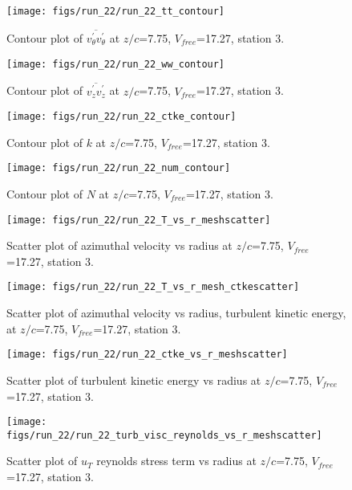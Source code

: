\begin{figure}[H]
\centering
\texttt{[image: figs/run\_22/run\_22\_tt\_contour]}
\caption{Contour plot of $\overline{v_{\theta}^{\prime} v_{\theta}^{\prime}}$ at $z/c$=7.75, $V_{free}$=17.27, station 3.}
\end{figure}


\begin{figure}[H]
\centering
\texttt{[image: figs/run\_22/run\_22\_ww\_contour]}
\caption{Contour plot of $\overline{v_{z}^{\prime} v_{z}^{\prime}}$ at $z/c$=7.75, $V_{free}$=17.27, station 3.}
\end{figure}


\begin{figure}[H]
\centering
\texttt{[image: figs/run\_22/run\_22\_ctke\_contour]}
\caption{Contour plot of $k$ at $z/c$=7.75, $V_{free}$=17.27, station 3.}
\end{figure}


\begin{figure}[H]
\centering
\texttt{[image: figs/run\_22/run\_22\_num\_contour]}
\caption{Contour plot of $N$ at $z/c$=7.75, $V_{free}$=17.27, station 3.}
\end{figure}


\begin{figure}[H]
\centering
\texttt{[image: figs/run\_22/run\_22\_T\_vs\_r\_meshscatter]}
\caption{Scatter plot of azimuthal velocity vs radius at $z/c$=7.75, $V_{free}$=17.27, station 3.}
\end{figure}


\begin{figure}[H]
\centering
\texttt{[image: figs/run\_22/run\_22\_T\_vs\_r\_mesh\_ctkescatter]}
\caption{Scatter plot of azimuthal velocity vs radius, turbulent kinetic energy, at $z/c$=7.75, $V_{free}$=17.27, station 3.}
\end{figure}


\begin{figure}[H]
\centering
\texttt{[image: figs/run\_22/run\_22\_ctke\_vs\_r\_meshscatter]}
\caption{Scatter plot of turbulent kinetic energy vs radius at $z/c$=7.75, $V_{free}$=17.27, station 3.}
\end{figure}


\begin{figure}[H]
\centering
\texttt{[image: figs/run\_22/run\_22\_turb\_visc\_reynolds\_vs\_r\_meshscatter]}
\caption{Scatter plot of $
u_T$ reynolds stress term vs radius at $z/c$=7.75, $V_{free}$=17.27, station 3.}
\end{figure}


